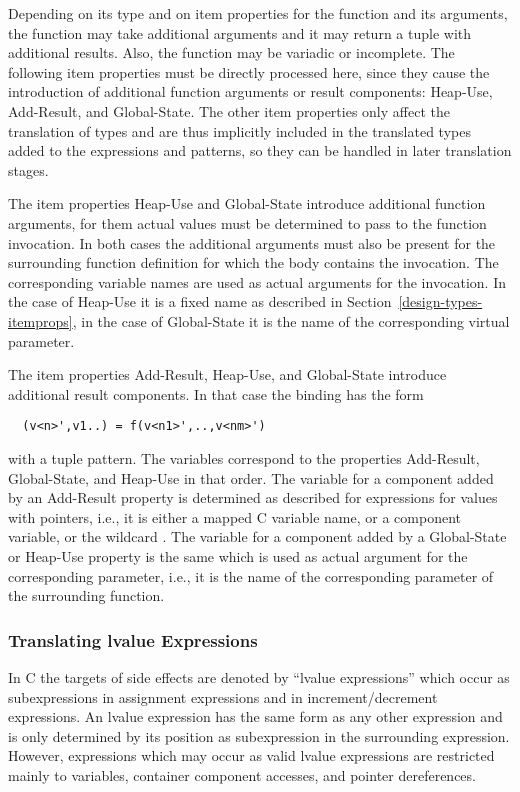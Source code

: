 Depending on its type and on item properties for the function and its arguments, the function may take additional arguments and
it may return a tuple with additional results. Also, the function may be variadic or incomplete. The following item properties
must be directly processed here, since they cause the introduction of additional function arguments or result components:
Heap-Use, Add-Result, and Global-State. The other item properties only affect the translation of types and are thus implicitly
included in the translated types added to the expressions and patterns, so they can be handled in later translation stages.

The item properties Heap-Use and Global-State introduce additional function arguments, for them actual values must be determined
to pass to the function invocation. In both cases the additional arguments must also be present for the surrounding function
definition for which the body contains the invocation. The corresponding variable names are used as actual arguments for the
invocation. In the case of Heap-Use it is a fixed name as described in Section~\ref{design-types-itemprops}, in the case of
Global-State it is the name of the corresponding virtual parameter.

The item properties Add-Result, Heap-Use, and Global-State introduce additional result components. In that case the binding has 
the form
\begin{verbatim}
  (v<n>',v1..) = f(v<n1>',..,v<nm>')
\end{verbatim}
with a tuple pattern. The variables  correspond to the properties Add-Result, Global-State, and Heap-Use in that order.
The variable for a component added by an Add-Result property is determined as described for expressions for values with pointers,
i.e., it is either a mapped C variable name, or a component variable, or the wildcard \code{\_}. The variable for a component
added by a Global-State or Heap-Use property is the same which is used as actual argument for the corresponding parameter, i.e.,
it is the name of the corresponding parameter of the surrounding function.

\subsubsection{Translating lvalue Expressions}

In C the targets of side effects are denoted by ``lvalue expressions'' which occur as subexpressions in assignment expressions and
in increment/decrement expressions. An lvalue expression has the same form as any other expression and is only determined by its 
position as subexpression in the surrounding expression. However, expressions which may occur as valid lvalue expressions are 
restricted mainly to variables, container component accesses, and pointer dereferences.

